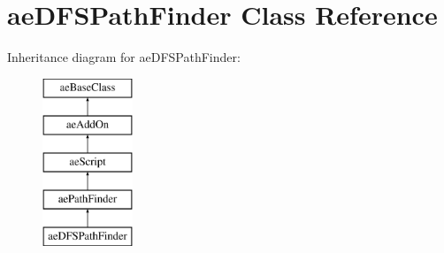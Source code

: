 \hypertarget{classae_d_f_s_path_finder}{}\section{ae\+D\+F\+S\+Path\+Finder Class Reference}
\label{classae_d_f_s_path_finder}
Inheritance diagram for ae\+D\+F\+S\+Path\+Finder\+:\begin{figure}[H]
\begin{center}
\leavevmode
\includegraphics[height=5.000000cm]{classae_d_f_s_path_finder}
\end{center}
\end{figure}
